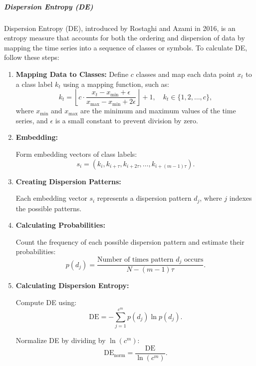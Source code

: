 \subparagraph{Dispersion Entropy (DE)}
Dispersion Entropy (DE), introduced by Rostaghi and Azami in 2016, is an entropy measure that accounts for both the ordering and dispersion of data by mapping the time series into a sequence of classes or symbols.
To calculate DE, follow these steps:

\begin{enumerate} \item \textbf{Mapping Data to Classes:}
Define $c$ classes and map each data point $x_t$ to a class label $k_t$ using a mapping function, such as:
\begin{equation}
    k_t = \left\lfloor c \cdot \frac{x_t - x_{\min} + \epsilon}{x_{\max} - x_{\min} + 2\epsilon} \right\rfloor + 1, \quad k_t \in \{1, 2, \dots, c\},
\end{equation}
where $x_{\min}$ and $x_{\max}$ are the minimum and maximum values of the time series, and $\epsilon$ is a small constant to prevent division by zero.

\item \textbf{Embedding:}

Form embedding vectors of class labels:
\begin{equation}
    s_i = \left( k_i, k_{i+\tau}, k_{i+2\tau}, \dots, k_{i+(m-1)\tau} \right).
\end{equation}

\item \textbf{Creating Dispersion Patterns:}

Each embedding vector $s_i$ represents a dispersion pattern $d_j$, where $j$ indexes the possible patterns.

\item \textbf{Calculating Probabilities:}

Count the frequency of each possible dispersion pattern and estimate their probabilities:
\begin{equation}
    p(d_j) = \frac{\text{Number of times pattern } d_j \text{ occurs}}{N - (m -1)\tau}.
\end{equation}

\item \textbf{Calculating Dispersion Entropy:}

Compute DE using:
\begin{equation}
    \mathrm{DE} = - \sum_{j=1}^{c^m} p(d_j) \ln p(d_j).
\end{equation}

Normalize DE by dividing by $\ln(c^m)$:
\begin{equation}
    \mathrm{DE}_{\text{norm}} = \frac{\mathrm{DE}}{\ln(c^m)}.
\end{equation}
\end{enumerate}

